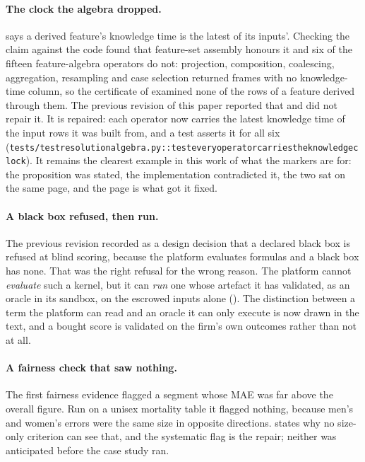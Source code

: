 \documentclass[11pt,a4paper]{article}
\renewcommand{\_}{\oldunderscore\allowbreak}
\theoremstyle{plain}
\theoremstyle{definition}
\theoremstyle{definition}
\theoremstyle{remark}
\begin{document}
\paragraph{The clock the algebra dropped.}  says a derived feature's knowledge time
is the latest of its inputs'. Checking the claim against the code found that feature-set assembly honours
it and six of the fifteen feature-algebra operators do not: projection, composition, coalescing,
aggregation, resampling and case selection returned frames with no knowledge-time column, so the
certificate of  examined none of the rows of a feature derived through them. The previous
revision of this paper reported that and did not repair it. It is repaired: each operator now carries the
latest knowledge time of the input rows it was built from, and a test asserts it for all six
(\texttt{tests/test\_resolution\_algebra.py::test\_every\_operator\_carries\_the\_knowledge\_clock}). It remains
the clearest example in this work of what the markers are for: the proposition was stated, the
implementation contradicted it, the two sat on the same page, and the page is what got it fixed.

\paragraph{A black box refused, then run.} The previous revision recorded as a design decision that a
declared black box is refused at blind scoring, because the platform evaluates formulas and a black box has
none. That was the right refusal for the wrong reason. The platform cannot \emph{evaluate} such a kernel, but
it can \emph{run} one whose artefact it has validated, as an oracle in its sandbox, on the escrowed inputs
alone (). The distinction between a term the platform can read and an oracle it can
only execute is now drawn in the text, and a bought score is validated on the firm's own outcomes rather
than not at all.

\paragraph{A fairness check that saw nothing.} The first fairness evidence flagged a segment whose MAE was
far above the overall figure. Run on a unisex mortality table it flagged nothing, because men's and women's
errors were the same size in opposite directions.  states why no size-only criterion can
see that, and the systematic flag is the repair; neither was anticipated before the case study ran.
\end{document}
